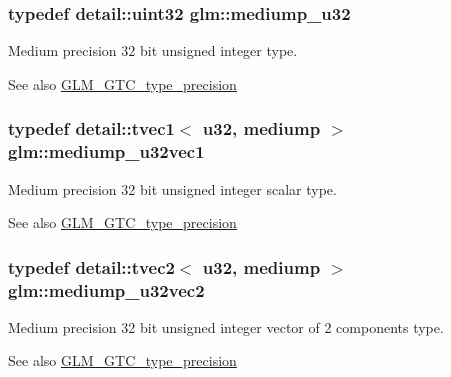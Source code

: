 \subsubsection[{\texorpdfstring{mediump\+\_\+u32}{mediump_u32}}]{\setlength{\rightskip}{0pt plus 5cm}typedef detail\+::uint32 {\bf glm\+::mediump\+\_\+u32}}\hypertarget{group__gtc__type__precision_gad0c27a525045c299a92306eb4cd7c13a}{}\label{group__gtc__type__precision_gad0c27a525045c299a92306eb4cd7c13a}
Medium precision 32 bit unsigned integer type. \begin{DoxySeeAlso}{See also}
\hyperlink{group__gtc__type__precision}{G\+L\+M\+\_\+\+G\+T\+C\+\_\+type\+\_\+precision} 
\end{DoxySeeAlso}
\subsubsection[{\texorpdfstring{mediump\+\_\+u32vec1}{mediump_u32vec1}}]{\setlength{\rightskip}{0pt plus 5cm}typedef detail\+::tvec1$<$ u32, mediump $>$ {\bf glm\+::mediump\+\_\+u32vec1}}\hypertarget{group__gtc__type__precision_ga323fb0ed8f492d918b087226db2994f3}{}\label{group__gtc__type__precision_ga323fb0ed8f492d918b087226db2994f3}
Medium precision 32 bit unsigned integer scalar type. \begin{DoxySeeAlso}{See also}
\hyperlink{group__gtc__type__precision}{G\+L\+M\+\_\+\+G\+T\+C\+\_\+type\+\_\+precision} 
\end{DoxySeeAlso}
\subsubsection[{\texorpdfstring{mediump\+\_\+u32vec2}{mediump_u32vec2}}]{\setlength{\rightskip}{0pt plus 5cm}typedef detail\+::tvec2$<$ u32, mediump $>$ {\bf glm\+::mediump\+\_\+u32vec2}}\hypertarget{group__gtc__type__precision_ga5d16ea7e110d8ba923ca347c16704f88}{}\label{group__gtc__type__precision_ga5d16ea7e110d8ba923ca347c16704f88}
Medium precision 32 bit unsigned integer vector of 2 components type. \begin{DoxySeeAlso}{See also}
\hyperlink{group__gtc__type__precision}{G\+L\+M\+\_\+\+G\+T\+C\+\_\+type\+\_\+precision} 
\end{DoxySeeAlso}

